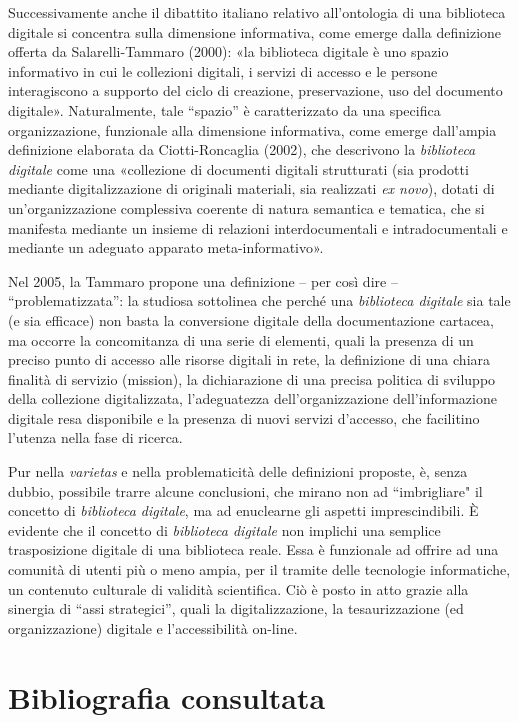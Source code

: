 \documentclass[
  b5paper,
  twoside,
  12pt,
  chapterprefix=false,
  bibliography=totocnumbered,
  parskip=false]{scrbook}
\begin{document}
Successivamente anche il dibattito italiano relativo all'ontologia di
una biblioteca digitale si concentra sulla dimensione informativa, come
emerge dalla definizione offerta da Salarelli-Tammaro (2000): «la
biblioteca digitale è uno spazio informativo in cui le collezioni
digitali, i servizi di accesso e le persone interagiscono a supporto del
ciclo di creazione, preservazione, uso del documento digitale».
Naturalmente, tale \enquote{spazio} è caratterizzato da una specifica
organizzazione, funzionale alla dimensione informativa, come emerge
dall'ampia definizione elaborata da Ciotti-Roncaglia (2002), che
descrivono la \emph{biblioteca digitale} come una «collezione di documenti
digitali strutturati (sia prodotti mediante digitalizzazione di
originali materiali, sia realizzati \emph{ex novo}), dotati di
un'organizzazione complessiva coerente di natura semantica e tematica,
che si manifesta mediante un insieme di relazioni interdocumentali e
intradocumentali e mediante un adeguato apparato meta-informativo».

Nel 2005, la Tammaro propone una definizione -- per così dire --
\enquote{problematizzata}: la studiosa sottolinea che perché una \emph{biblioteca
digitale} sia tale (e sia efficace) non basta la conversione digitale
della documentazione cartacea, ma occorre la concomitanza di una serie
di elementi, quali la presenza di un preciso punto di accesso alle
risorse digitali in rete, la definizione di una chiara finalità di
servizio (mission), la dichiarazione di una precisa politica di sviluppo
della collezione digitalizzata, l'adeguatezza dell'organizzazione
dell'informazione digitale resa disponibile e la presenza di nuovi
servizi d'accesso, che facilitino l'utenza nella fase di ricerca.

Pur nella \emph{varietas} e nella problematicità delle definizioni proposte,
è, senza dubbio, possibile trarre alcune conclusioni, che mirano non ad
``imbrigliare" il concetto di \emph{biblioteca digitale}, ma ad enuclearne gli
aspetti imprescindibili. È evidente che il concetto di \emph{biblioteca
digitale} non implichi una semplice trasposizione digitale di una
biblioteca reale. Essa è funzionale ad offrire ad una comunità di utenti
più o meno ampia, per il tramite delle tecnologie informatiche, un
contenuto culturale di validità scientifica. Ciò è posto in atto grazie
alla sinergia di \enquote{assi strategici}, quali la digitalizzazione, la
tesaurizzazione (ed organizzazione) digitale e l'accessibilità on-line.

\hypertarget{bibliografia-consultata-3}{%
\section*{Bibliografia consultata}\label{bibliografia-consultata-3}}
\end{document}

